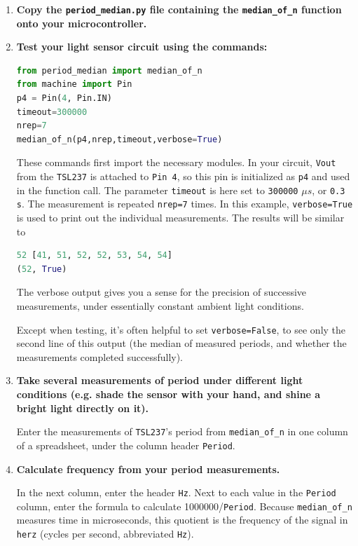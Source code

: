 \begin{enumerate}[resume]
	\item \textbf{Copy the \lstinline{period_median.py} file containing the \lstinline{median_of_n} function onto your microcontroller.}
	\item \textbf{Test your light sensor circuit using the commands:}
\begin{lstlisting}[language=Python]
from period_median import median_of_n
from machine import Pin
p4 = Pin(4, Pin.IN)
timeout=300000
nrep=7
median_of_n(p4,nrep,timeout,verbose=True)
\end{lstlisting}
	These commands first import the necessary modules.
	In your circuit, \texttt{Vout} from the \texttt{TSL237} is attached to \texttt{Pin 4}, so this pin is initialized as \texttt{p4} and used in the function call.
	The parameter \texttt{timeout} is here set to \texttt{300000} $\mu s$, or \texttt{0.3 s}.
	The measurement is repeated \texttt{nrep=7} times.
	In this example, \texttt{verbose=True} is used to print out the individual measurements.
	The results will be similar to
\begin{lstlisting}[language=Python]
52 [41, 51, 52, 52, 53, 54, 54]
(52, True)
\end{lstlisting}
	The verbose output gives you a sense for the precision of successive measurements, under essentially constant ambient light conditions.

	\smallskip
	Except when testing, it's often helpful to set \lstinline{verbose=False}, to see only the second line of this output (the median of measured periods, and whether the measurements completed successfully).

	\item \textbf{Take several measurements of period under different light conditions (e.g. shade the sensor with your hand, and shine a bright light directly on it).}

	Enter the measurements of \texttt{TSL237}'s period from \lstinline{median_of_n} in one column of a spreadsheet, under the column header \texttt{Period}.

	\item \textbf{Calculate frequency from your period measurements.}

	In the next column, enter the header \texttt{Hz}.
	Next to each value in the \texttt{Period} column, enter the formula to calculate 1000000/\texttt{Period}.
	Because \lstinline{median_of_n} measures time in microseconds, this quotient is the frequency of the signal in \texttt{herz} (cycles per second, abbreviated \texttt{Hz}).


\end{enumerate}
